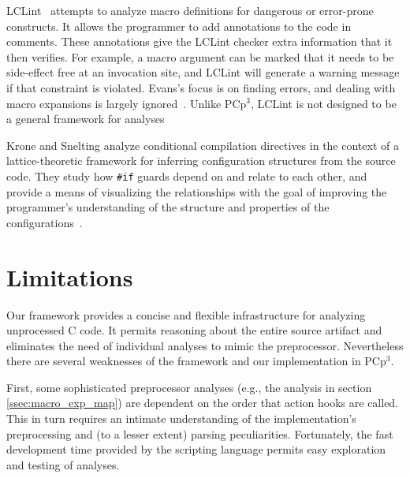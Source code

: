 \documentclass{article}
\newcommand{\pcp}{\mbox{\textsf{PCp}$^3$}}
\newcommand{\C}{\mbox{C}}
\newcommand{\ppd}[1]{\texttt{\##1}}
\newcommand{\eg}{e.g.,}
\begin{document}
LCLint~\cite{LCLint} attempts to analyze macro definitions for dangerous or
error-prone constructs.  It allows the programmer to add annotations to
the code in comments.  These annotations give the LCLint checker extra
information that it then verifies.  For example, a macro argument can be
marked that it needs to be side-effect free at an invocation site, and
LCLint will generate a warning message if that constraint is violated.
Evans's focus is on finding errors, and dealing with macro expansions is
largely ignored~\cite[Ch.~8]{LCLint}.  Unlike \pcp{}, LCLint is not
designed to be a general framework for analyses

Krone and Snelting analyze conditional compilation directives in the
context of a lattice-theoretic framework for inferring configuration
structures from the source code.  They study how \ppd{if} guards depend
on and relate to each other, and provide a means of visualizing the
relationships with the goal of improving the programmer's understanding
of the structure and properties of the configurations~\cite{Krone94}.

\section*{Limitations}
\label{sec:limitations}




Our framework provides a concise and flexible infrastructure for analyzing
unprocessed \C{} code. It permits reasoning about the entire source
artifact and eliminates the need of individual analyses to mimic the
preprocessor.  Nevertheless there are several weaknesses of the
framework and our implementation in \pcp{}.

First, some sophisticated preprocessor analyses (\eg{} the 
analysis in section \ref{ssec:macro_exp_map}) are dependent on the order that
action hooks are called.  This in turn requires an intimate
understanding of the implementation's preprocessing and (to a lesser
extent) parsing
peculiarities.  Fortunately, the fast development time provided by the
scripting language permits easy exploration and testing of analyses.
\end{document}
